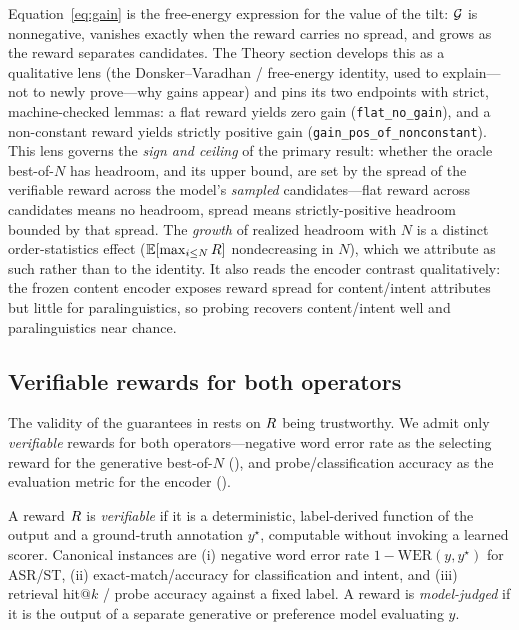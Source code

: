 Equation~\eqref{eq:gain} is the free-energy expression for the value of the tilt: $\mathcal{G}$ is nonnegative, vanishes exactly when the reward carries no spread, and grows as the reward separates candidates. The Theory section develops this as a qualitative lens (the Donsker--Varadhan / free-energy identity, used to explain---not to newly prove---why gains appear) and pins its two endpoints with strict, machine-checked lemmas: a flat reward yields zero gain (\texttt{flat\_no\_gain}), and a non-constant reward yields strictly positive gain (\texttt{gain\_pos\_of\_nonconstant}). This lens governs the \emph{sign and ceiling} of the primary result: whether the oracle best-of-$N$ has headroom, and its upper bound, are set by the spread of the verifiable reward across the model's \emph{sampled} candidates---flat reward across candidates means no headroom, spread means strictly-positive headroom bounded by that spread. The \emph{growth} of realized headroom with $N$ is a distinct order-statistics effect ($\mathbb{E}[\max_{i\le N}R]$ nondecreasing in $N$), which we attribute as such rather than to the identity. It also reads the encoder contrast qualitatively: the frozen content encoder exposes reward spread for content/intent attributes but little for paralinguistics, so probing recovers content/intent well and paralinguistics near chance.

\subsection{Verifiable rewards for both operators}
\label{subsec:reward}

The validity of the guarantees in  rests on $R$ being trustworthy. We admit only \emph{verifiable} rewards for both operators---negative word error rate as the selecting reward for the generative best-of-$N$ (), and probe/classification accuracy as the evaluation metric for the encoder ().

\begin{definition}
\label{def:verifiable}
A reward $R$ is \emph{verifiable} if it is a deterministic, label-derived function of the output and a ground-truth annotation $y^\star$, computable without invoking a learned scorer. Canonical instances are (i) negative word error rate $1-\mathrm{WER}(y,y^\star)$ for ASR/ST, (ii) exact-match/accuracy for classification and intent, and (iii) retrieval hit$@k$ / probe accuracy against a fixed label. A reward is \emph{model-judged} if it is the output of a separate generative or preference model evaluating $y$.
\end{definition}

